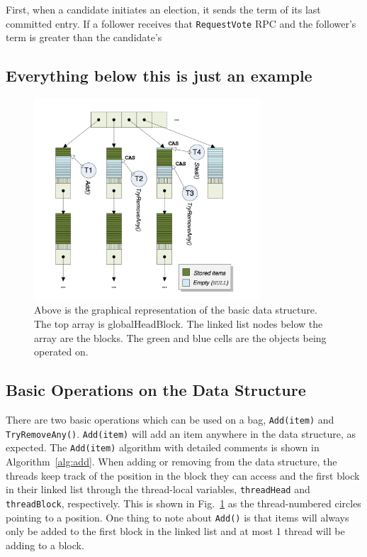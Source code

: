 First, when a candidate initiates an election, it sends the term of its last committed entry.
If a follower receives that \texttt{RequestVote} RPC and the follower's term is greater than the candidate's











\newpage

\subsection{Everything below this is just an example}


\begin{figure}
\centering{}
\includegraphics[width=0.75\textwidth]{datastructure.png}
\caption{\label{fig:datastruct}Above is the graphical representation of the basic data structure. The top array is globalHeadBlock. The linked list nodes below the array are the blocks. The green and blue cells are the objects being operated on.}
\end{figure}

\subsection{Basic Operations on the Data Structure}

There are two basic operations which can be used on a bag, \texttt{Add(item)} and \texttt{TryRemoveAny()}.
\texttt{Add(item)} will add an item anywhere in the data structure, as expected.
The \texttt{Add(item)} algorithm with detailed comments is shown in Algorithm~\ref{alg:add}.
When adding or removing from the data structure, the threads keep track of the position in the block they can access
and the first block in their linked list through the thread-local variables, \texttt{threadHead}
and \texttt{threadBlock}, respectively. This is shown in Fig.~\ref{fig:datastruct} as the thread-numbered
circles pointing to a position. One thing to note about \texttt{Add()} is that items will always
only be added to the first block in the linked list and at most 1 thread will be adding to a block.

